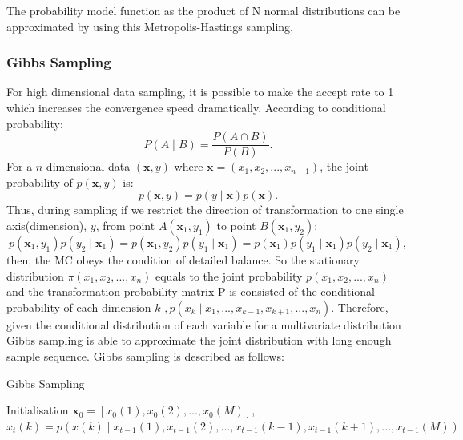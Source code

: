 	The probability model function as the product of N normal distributions can be approximated by using this Metropolis-Hastings sampling.
\subsubsection{Gibbs Sampling}
	\label{sec:Gibbs}
	For high dimensional data sampling, it is possible to make the accept rate to 1 which increases the convergence speed dramatically.
	According to conditional probability:
	\begin{equation}
		P(A \mid B) = \frac{P(A \cap B)}{P(B)}.
	\end{equation}
	For a $ n $ dimensional data $ (\mathbf{x}, y) $ where $ \mathbf{x}=(x_1,x_2,...,x_{n-1}) $, the joint probability of $p(\mathbf{x},y)$ is:
	\begin{equation}
		p(\mathbf{x},y) = p(y \mid \mathbf{x})p(\mathbf{x}).
	\end{equation}
	Thus, during sampling if we restrict the direction of transformation to one single axis(dimension), $ y $, from point $ A(\mathbf{x}_1, y_1) $ to point $ B(\mathbf{x}_1, y_2)$:
	\begin{equation}
		p(\mathbf{x}_1, y_1)p(y_2 \mid \mathbf{x}_1) = p(\mathbf{x}_1, y_2)p(y_1 \mid \mathbf{x}_1) = p(\mathbf{x}_1)p(y_1 \mid \mathbf{x}_1)p(y_2 \mid \mathbf{x}_1),
	\end{equation}
	then, the MC obeys the condition of detailed balance.
	So the stationary distribution $ \pi(x_1,x_2,...,x_n) $ equals to the joint probability $ p(x_1,x_2,...,x_n) $ and the transformation probability matrix P is consisted of the conditional probability of each dimension $ k $ $,  p(x_k \mid x_1,...,x_{k-1},x_{k+1},...,x_n) $.
	Therefore, given the conditional distribution of each variable for a multivariate distribution Gibbs sampling is able to approximate the joint distribution with long enough sample sequence.
	Gibbs sampling is described as follows:
	\begin{algorithm}[h]
	  \caption{Gibbs Sampling}
	  \label{alg:gibbs}
	  \begin{algorithmic}
	  	
	    \State Initialisation $\mathbf{x}_0 = [x_0(1),x_0(2),...,x_0(M)]$,  
	    		\State $ x_t(k) = p(x(k) \mid x_{t-1}(1),x_{t-1}(2),...,x_{t-1}(k-1),x_{t-1}(k+1),...,x_{t-1}(M))$\\
			\EndFor
		\EndFor
	  \end{algorithmic}
	\end{algorithm}
	
